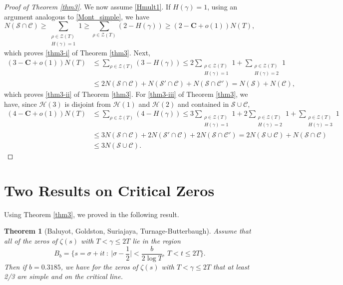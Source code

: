 \documentclass[11pt]{amsart}
\newtheorem{theorem}{Theorem}%
\theoremstyle{remark}
\theoremstyle{plain}
\numberwithin{equation}{section}
\begin{document}
\begin{proof}[Proof of Theorem \ref{thm3}]
We now assume \eqref{Hmult1}.
If $H(\gamma)=1$, using an argument analogous to \eqref{Mont_simple}, we have
\[ N(\mathcal{S}\cap\mathcal{C}) \ge \sum_{\substack{\rho \in \mathcal{Z}(T)\\ H(\gamma)=1}} 1 \ge \sum_{\rho \in \mathcal{Z}(T)} (2-H(\gamma))\ge (2-\mathbf{C}+o(1))N(T), \]
which proves \ref{thm3-i} of Theorem \ref{thm3}.
Next, 
\[ \begin{split} (3 -\mathbf{C}+o(1) )N(T)&\le \sum_{\rho \in \mathcal{Z}(T)} (3-H(\gamma))\le 2\sum_{\substack{\rho \in \mathcal{Z}(T)\\ H(\gamma)=1}} 1 +\sum_{\substack{\rho \in \mathcal{Z}(T)\\ H(\gamma)=2}} 1 \\ &
\le 2 N(\mathcal{S}\cap\mathcal{C}) + N(\mathcal{S}'\cap\mathcal{C}) + N(\mathcal{S}\cap\mathcal{C}') = N(\mathcal{S}) + N(\mathcal{C}), 
\end{split} \]
which proves \ref{thm3-ii} of Theorem \ref{thm3}. For \ref{thm3-iii} of Theorem \ref{thm3}, we have, since $\mathcal{H}(3)$ is disjoint from $\mathcal{H}(1)$ and $\mathcal{H}(2)$ and contained in $\mathcal{S}\cup\mathcal{C}$,  
\[ \begin{split}  (4-\mathbf{C}+o(1))N(T) &\le \sum_{\rho \in \mathcal{Z}(T)} (4-H(\gamma))\le 3\sum_{\substack{\rho \in \mathcal{Z}(T)\\ H(\gamma) =1 }} 1 +2\sum_{\substack{\rho \in \mathcal{Z}(T)\\ H(\gamma)=2}} 1 + \sum_{\substack{\rho \in \mathcal{Z}(T)\\ H(\gamma)=3}} 1\\ & \le 3N(\mathcal{S}\cap\mathcal{C}) + 2N(\mathcal{S}'\cap\mathcal{C}) + 2N(\mathcal{S}\cap\mathcal{C}') = 2N(\mathcal{S}\cup\mathcal{C}) +N(\mathcal{S}\cap\mathcal{C})
\\& \le
3N(\mathcal{S}\cup\mathcal{C}).
\end{split}\]
\end{proof}


\section{Two Results on Critical Zeros}

Using Theorem \ref{thm3}, we proved in \cite{BGST-CL} the following result.
\begin{theorem}[Baluyot, Goldston, Suriajaya, Turnage-Butterbaugh]\label{thm4} Assume that all of the zeros of $\zeta(s)$ with $T<\gamma \le 2T$ lie in the region
\begin{equation} B_b = \{ s=\sigma + it \ : \ \Big|\sigma - \frac12\Big|< \frac{b}{2\log{T}},\ T< t\le 2T \}.\end{equation} Then if $b=0.3185$, we have for the zeros of $\zeta(s)$ with $T<\gamma \le 2T$ that at least 2/3 are simple and on the critical line. 
\end{theorem}
\end{document}
